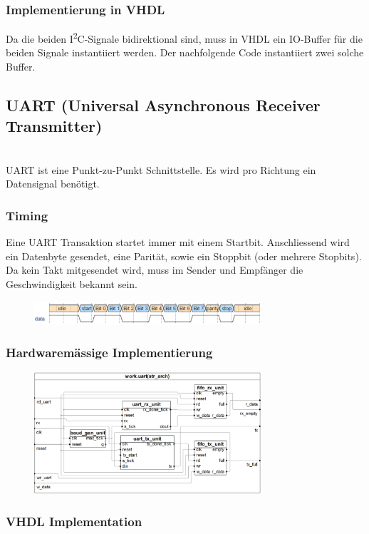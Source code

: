 \subsubsection{Implementierung in VHDL}
Da die beiden I\textsuperscript{2}C-Signale bidirektional sind, muss in VHDL ein IO-Buffer für die beiden Signale instantiiert werden. Der nachfolgende Code instantiiert zwei solche Buffer.


\subsection{UART (Universal Asynchronous Receiver Transmitter)}$~$ \\
UART ist eine Punkt-zu-Punkt Schnittstelle. Es wird pro Richtung ein Datensignal benötigt.

\subsubsection{Timing}
Eine UART Transaktion startet immer mit einem Startbit. Anschliessend wird ein Datenbyte gesendet, eine Parität, sowie ein Stoppbit (oder mehrere Stopbits). Da kein Takt mitgesendet wird, muss im Sender und Empfänger die Geschwindigkeit bekannt sein.
\begin{figure}[H]
    \includegraphics[width=0.75\textwidth]{images/uart_timing.png}
\end{figure}

\subsubsection{Hardwaremässige Implementierung}
\begin{figure}[H]
    \includegraphics[width=0.75\textwidth]{images/uart_hardware.png}
\end{figure}

\subsubsection{VHDL Implementation}

